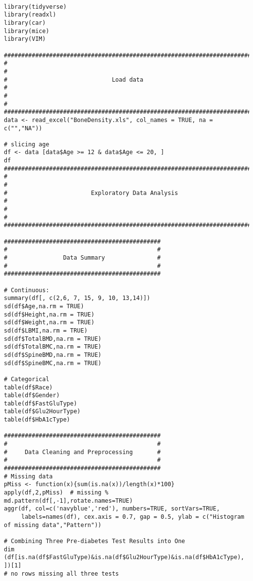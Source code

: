 \documentclass[11pt]{article}
\begin{document}
\begin{verbatim}

library(tidyverse)
library(readxl)
library(car)
library(mice)
library(VIM)

#######################################################################
#                                                                     #
#                              Load data                              #
#                                                                     #
#######################################################################
data <- read_excel("BoneDensity.xls", col_names = TRUE, na = c("","NA"))

# slicing age
df <- data [data$Age >= 12 & data$Age <= 20, ]
df
#######################################################################
#                                                                     #
#                        Exploratory Data Analysis                    #
#                                                                     #
#######################################################################

#############################################
#                                           #
#                Data Summary               #
#                                           #
#############################################

# Continuous:
summary(df[, c(2,6, 7, 15, 9, 10, 13,14)])
sd(df$Age,na.rm = TRUE)
sd(df$Height,na.rm = TRUE)
sd(df$Weight,na.rm = TRUE)
sd(df$LBMI,na.rm = TRUE)
sd(df$TotalBMD,na.rm = TRUE)
sd(df$TotalBMC,na.rm = TRUE)
sd(df$SpineBMD,na.rm = TRUE)
sd(df$SpineBMC,na.rm = TRUE)

# Categorical
table(df$Race)
table(df$Gender)
table(df$FastGluType)
table(df$Glu2HourType)
table(df$HbA1cType)

#############################################
#                                           #
#     Data Cleaning and Preprocessing       #
#                                           #
#############################################
# Missing data 
pMiss <- function(x){sum(is.na(x))/length(x)*100}
apply(df,2,pMiss)  # missing %
md.pattern(df[,-1],rotate.names=TRUE) 
aggr(df, col=c('navyblue','red'), numbers=TRUE, sortVars=TRUE, 
     labels=names(df), cex.axis = 0.7, gap = 0.5, ylab = c("Histogram of missing data","Pattern"))

# Combining Three Pre-diabetes Test Results into One
dim (df[is.na(df$FastGluType)&is.na(df$Glu2HourType)&is.na(df$HbA1cType), ])[1] 
# no rows missing all three tests


\end{verbatim}
\end{document}
